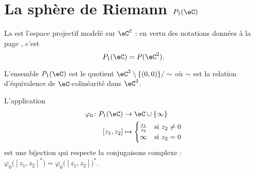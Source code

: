 
\section{La sphère de Riemann \( P_1(\eC)\)}

\begin{definition}      \label{DEFooSZGNooTzFYbh}
	La  est l'espace projectif modelé sur \( \eC^2\) : en vertu des notations données à la page \pageref{PgNotimesjNtMoW}, c'est
	\begin{equation}
		P_1(\eC)=P(\eC^2).
	\end{equation}
\end{definition}

L'ensemble \( P_1(\eC)\) est le quotient \( \eC^2\setminus\{ (0,0) \}/\sim\) où \( \sim\) est la relation d'équivalence de \( \eC\)-colinéarité dans \( \eC^2\).

\begin{lemma}       \label{LEMooKWZDooEIraSJ}
	L'application
	\begin{equation}        \label{EQooKJIZooZjhzuU}
		\begin{aligned}
			\varphi_0\colon P_1(\eC) & \to \eC\cup\{ \infty \}                            \\
			[z_1,z_2]                & \mapsto \begin{cases}
				                                   \frac{ z_1 }{ z_2 } & \text{si } z_2\neq 0 \\
				                                   \infty              & \text{si } z_2=0
			                                   \end{cases}
		\end{aligned}
	\end{equation}
	est une bijection qui respecte la conjugaisons complexe : \( \varphi_0\big( [z_1,z_2]^* \big)=\varphi_0\big( [z_1,z_2] \big)^*\).
\end{lemma}

